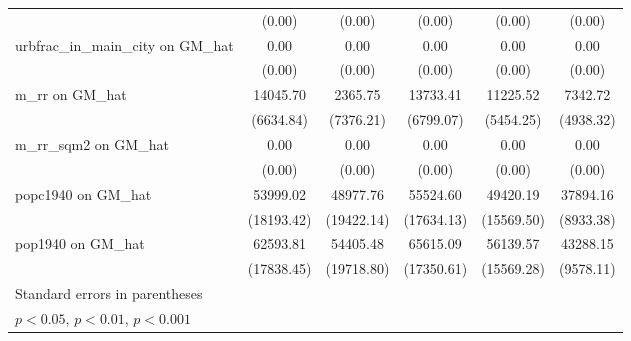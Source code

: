 \begin{table}[htbp]
\begin{tabular}{l*{5}{c}}
                &   (0.00)         &   (0.00)         &   (0.00)         &   (0.00)         &   (0.00)         \\
\addlinespace
urbfrac\_in\_main\_city on GM\_hat&     0.00         &     0.00\sym{*}  &     0.00         &     0.00         &     0.00         \\
                &   (0.00)         &   (0.00)         &   (0.00)         &   (0.00)         &   (0.00)         \\
\addlinespace
m\_rr on GM\_hat  & 14045.70\sym{*}  &  2365.75         & 13733.41\sym{*}  & 11225.52\sym{*}  &  7342.72         \\
                &(6634.84)         &(7376.21)         &(6799.07)         &(5454.25)         &(4938.32)         \\
\addlinespace
m\_rr\_sqm2 on GM\_hat&     0.00\sym{**} &     0.00\sym{***}&     0.00\sym{***}&     0.00\sym{**} &     0.00\sym{***}\\
                &   (0.00)         &   (0.00)         &   (0.00)         &   (0.00)         &   (0.00)         \\
\addlinespace
popc1940 on GM\_hat& 53999.02\sym{**} & 48977.76\sym{*}  & 55524.60\sym{**} & 49420.19\sym{**} & 37894.16\sym{***}\\
                &(18193.42)         &(19422.14)         &(17634.13)         &(15569.50)         &(8933.38)         \\
\addlinespace
pop1940 on GM\_hat& 62593.81\sym{***}& 54405.48\sym{**} & 65615.09\sym{***}& 56139.57\sym{***}& 43288.15\sym{***}\\
                &(17838.45)         &(19718.80)         &(17350.61)         &(15569.28)         &(9578.11)         \\
\bottomrule
\multicolumn{6}{l}{\footnotesize Standard errors in parentheses}\\
\multicolumn{6}{l}{\footnotesize \sym{*} \(p<0.05\), \sym{**} \(p<0.01\), \sym{***} \(p<0.001\)}\\
\end{tabular}
\end{table}
